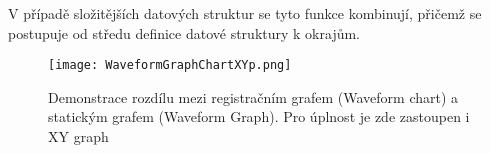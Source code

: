      V případě složitějších datových struktur se tyto funkce kombinují, přičemž se postupuje od
     středu definice datové struktury k okrajům.  
       
     \begin{figure}[ht!]
       \centering
       \texttt{[image: WaveformGraphChartXYp.png]} 
       \caption[Waveform Graph, Waveform Chart a XY Graph]{Demonstrace rozdílu mezi registračním
       grafem (Waveform chart) a statickým grafem (Waveform Graph). Pro úplnost je zde zastoupen i
               XY graph}
       \label{EMS:fig_WaveformGraphChartXYp}
     \end{figure} 
        
\printbibliography[title={Seznam literatury},heading=subbibliography]
